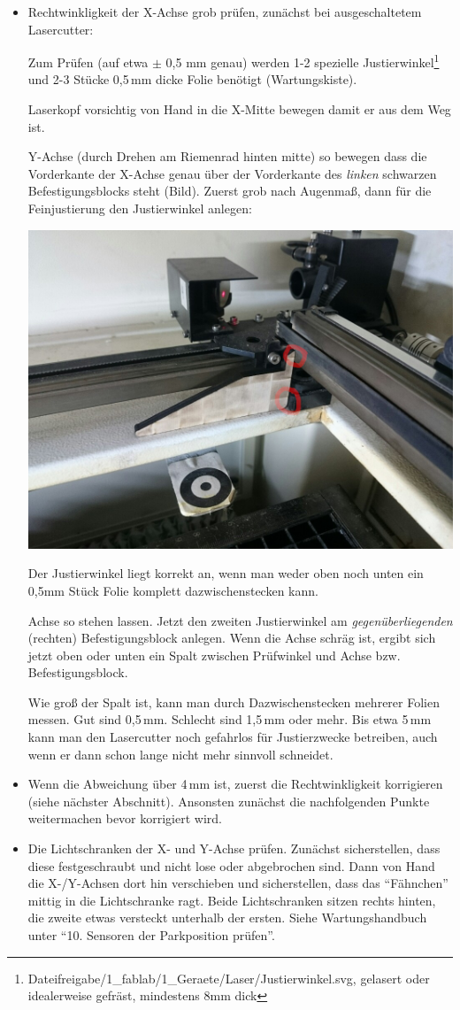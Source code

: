 \documentclass{\basedir/fablab-document}
\begin{document}
\begin{itemize}
		\item Rechtwinkligkeit der X-Achse grob prüfen, zunächst bei ausgeschaltetem Lasercutter:

		Zum Prüfen (auf etwa $\pm$ 0,5 mm genau) werden 1-2 spezielle Justierwinkel\footnote{Dateifreigabe/1\_fablab/1\_Geraete/Laser/Justierwinkel.svg, gelasert oder idealerweise gefräst, mindestens 8mm dick} und 2-3 Stücke 0,5\,mm dicke Folie benötigt (Wartungskiste).

		Laserkopf vorsichtig von Hand in die X-Mitte bewegen damit er aus dem Weg ist.

		Y-Achse (durch Drehen am Riemenrad hinten mitte) so bewegen dass die Vorderkante der X-Achse genau über der Vorderkante des \emph{linken} schwarzen Befestigungsblocks steht (Bild). Zuerst grob nach Augenmaß, dann für die Feinjustierung den Justierwinkel anlegen:

		\includegraphics[width=.5\linewidth]{img/laserjustierwinkel}

		Der Justierwinkel liegt korrekt an, wenn man weder oben noch unten ein 0,5mm Stück Folie komplett dazwischenstecken kann.

		Achse so stehen lassen. Jetzt den zweiten Justierwinkel am \emph{gegenüberliegenden} (rechten) Befestigungsblock anlegen. Wenn die Achse schräg ist, ergibt sich jetzt oben oder unten ein Spalt zwischen Prüfwinkel und Achse bzw. Befestigungsblock.

		Wie groß der Spalt ist, kann man durch Dazwischenstecken mehrerer Folien messen. Gut sind 0,5\,mm. Schlecht sind 1,5\,mm oder mehr. Bis etwa 5\,mm kann man den Lasercutter noch gefahrlos für Justierzwecke betreiben, auch wenn er dann schon lange nicht mehr sinnvoll schneidet.

		\item Wenn die Abweichung über 4\,mm ist, zuerst die Rechtwinkligkeit korrigieren (siehe nächster Abschnitt). Ansonsten zunächst die nachfolgenden Punkte weitermachen bevor korrigiert wird.

		\item Die Lichtschranken der X- und Y-Achse prüfen. Zunächst sicherstellen, dass diese festgeschraubt und nicht lose oder abgebrochen sind. Dann von Hand die X-/Y-Achsen dort hin verschieben und sicherstellen, dass das \enquote{Fähnchen} mittig in die Lichtschranke ragt. Beide Lichtschranken sitzen rechts hinten, die zweite etwas versteckt unterhalb der ersten. Siehe Wartungshandbuch unter \enquote{10. Sensoren der Parkposition prüfen}.


\end{itemize}
\end{document}
